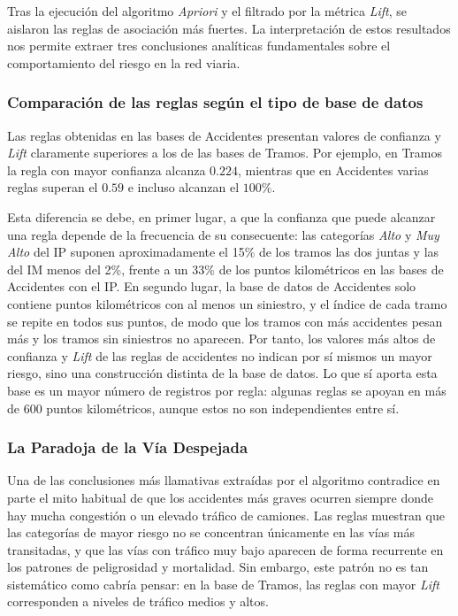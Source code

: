 \documentclass[twoside,a4paper,12pt,onecolumn,openany]{book}
\begin{document}
Tras la ejecución del algoritmo \textit{Apriori} y el filtrado por la métrica \textit{Lift}, se aislaron las reglas de asociación más fuertes. La interpretación de estos resultados nos permite extraer tres conclusiones analíticas fundamentales sobre el comportamiento del riesgo en la red viaria.

\subsubsection{Comparación de las reglas según el tipo de base de datos}
Las reglas obtenidas en las bases de Accidentes presentan valores de confianza y \textit{Lift} claramente superiores a los de las bases de Tramos. Por ejemplo, en Tramos la regla con mayor confianza alcanza $0.224$, mientras que en Accidentes varias reglas superan el $0.59$ e incluso alcanzan el $100\%$.

\vspace{0.5cm}

Esta diferencia se debe, en primer lugar, a que la confianza que puede alcanzar una regla depende de la frecuencia de su consecuente: las categorías \textit{Alto} y \textit{Muy Alto} del IP suponen aproximadamente el 15\% de los tramos las dos juntas y las del IM menos del 2\%, frente a un 33\% de los puntos kilométricos en las bases de Accidentes con el IP. En segundo lugar, la base de datos de Accidentes solo contiene puntos kilométricos con al menos un siniestro, y el índice de cada tramo se repite en todos sus puntos, de modo que los tramos con más accidentes pesan más y los tramos sin siniestros no aparecen. Por tanto, los valores más altos de confianza y \textit{Lift} de las reglas de accidentes no indican por sí mismos un mayor riesgo, sino una construcción distinta de la base de datos. Lo que sí aporta esta base es un mayor número de registros por regla: algunas reglas se apoyan en más de 600 puntos kilométricos, aunque estos no son independientes entre sí.

\subsubsection{La Paradoja de la Vía Despejada}
Una de las conclusiones más llamativas extraídas por el algoritmo contradice en parte el mito habitual de que los accidentes más graves ocurren siempre donde hay mucha congestión o un elevado tráfico de camiones. Las reglas muestran que las categorías de mayor riesgo no se concentran únicamente en las vías más transitadas, y que las vías con tráfico muy bajo aparecen de forma recurrente en los patrones de peligrosidad y mortalidad. Sin embargo, este patrón no es tan sistemático como cabría pensar: en la base de Tramos, las reglas con mayor \textit{Lift} corresponden a niveles de tráfico medios y altos.
\end{document}
